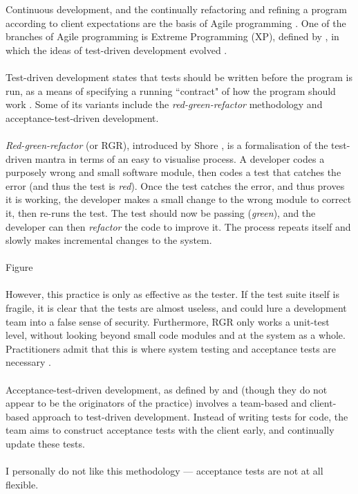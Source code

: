 Continuous development, and the continually refactoring and refining a program according to client
expectations are the basis of Agile programming \FIXME.
One of the branches of Agile programming is Extreme Programming (XP), defined by \FIXME, in which
the ideas of test-driven development evolved \FIXME.\\
\\
Test-driven development states that tests should be written before the program is run, as a means of
specifying a running ``contract" of how the program should work \FIXME.
Some of its variants include the {\em red-green-refactor} methodology and acceptance-test-driven
development.\\
\\
{\em Red-green-refactor} (or RGR), introduced by Shore \FIXME, is a formalisation of the test-driven mantra in
terms of an easy to visualise process.
A developer codes a purposely wrong and small software module, then codes a test that catches the
error (and thus the test is {\em red}).
Once the test catches the error, and thus proves it is working, the developer makes a small change
to the wrong module to correct it, then re-runs the test.
The test should now be passing ({\em green}), and the developer can then {\em refactor} the code to
improve it.
The process repeats itself and slowly makes incremental changes to the system.\\
\\
\FIXME Figure\\
\\
However, this practice is only as effective as the tester.
If the test suite itself is fragile, it is clear that the tests are almost useless, and could lure a
development team into a false sense of security.
Furthermore, RGR only works a unit-test level, without looking beyond small code modules and at the
system as a whole.
Practitioners admit that this is where system testing and acceptance tests are necessary \FIXME.\\
\\
Acceptance-test-driven development, as defined by \FIXME and \FIXME (though they do not appear to be
the originators of the practice) involves a team-based and client-based approach to test-driven
development.
Instead of writing tests for code, the team aims to construct acceptance tests with the client
early, and continually update these tests.\\
\\
I personally do not like this methodology --- acceptance tests are not at all flexible. 
